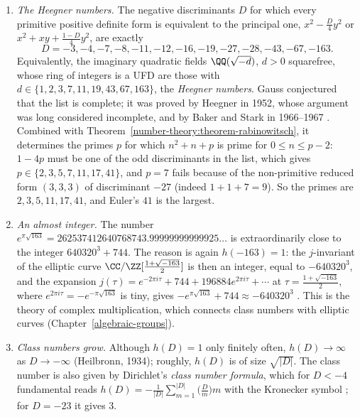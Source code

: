 \begin{remark}\label{number-theory:remark-heegner}
\begin{enumerate}
\item \emph{The Heegner numbers.} The negative discriminants $D$ for which every primitive positive definite form is equivalent to the principal one, $x^2 - \frac D4y^2$ or $x^2 + xy + \frac{1 - D}4y^2$,
are exactly
\[
D = -3, -4, -7, -8, -11, -12, -16, -19, -27, -28, -43, -67, -163 .
\]
Equivalently, the imaginary quadratic fields $\QQ(\sqrt{-d})$, $d > 0$ squarefree, whose ring of integers is a UFD are those with $d \in \{1, 2, 3, 7, 11, 19, 43, 67, 163\}$, the \emph{Heegner numbers}. Gauss
conjectured that the list is complete; it was proved by Heegner in 1952, whose argument was long considered incomplete, and by Baker and Stark in 1966--1967 \cite{cox-primes}. Combined with
Theorem~\ref{number-theory:theorem-rabinowitsch}, it determines the primes $p$ for which $n^2 + n + p$ is prime for $0 \leq n \leq p - 2$: $1 - 4p$ must be one of the odd discriminants in the list, which gives
$p \in \{2, 3, 5, 7, 11, 17, 41\}$, and $p = 7$ fails because of the non-primitive reduced form $(3, 3, 3)$ of discriminant $-27$ (indeed $1 + 1 + 7 = 9$). So the primes are $2, 3, 5, 11, 17, 41$, and Euler's
$41$ is the largest.
\item \emph{An almost integer.} The number $e^{\pi\sqrt{163}} = 262537412640768743.99999999999925\ldots$ is extraordinarily close to the integer $640320^3 + 744$. The reason is again $h(-163) = 1$: the
$j$-invariant of the elliptic curve $\CC/\ZZ[\frac{1 + \sqrt{-163}}{2}]$ is then an integer, equal to $-640320^3$, and the expansion $j(\tau) = e^{-2\pi i\tau} + 744 + 196884e^{2\pi i\tau} + \cdots$ at
$\tau = \frac{1 + \sqrt{-163}}{2}$, where $e^{2\pi i\tau} = -e^{-\pi\sqrt{163}}$ is tiny, gives $-e^{\pi\sqrt{163}} + 744 \approx -640320^3$ \cite{cox-primes}. This is the theory of complex
multiplication, which connects class numbers with elliptic curves (Chapter~\ref{algebraic-groups}).
\item \emph{Class numbers grow.} Although $h(D) = 1$ only finitely often, $h(D) \to \infty$ as $D \to -\infty$ (Heilbronn, 1934); roughly, $h(D)$ is of size $\sqrt{|D|}$. The class number is also given
by Dirichlet's \emph{class number formula}, which for $D < -4$ fundamental reads $h(D) = -\frac1{|D|}\sum_{m=1}^{|D|}\bigl(\frac{D}{m}\bigr)m$ with the Kronecker symbol \cite{cox-primes}; for $D = -23$ it
gives $3$.
\end{enumerate}
\end{remark}

